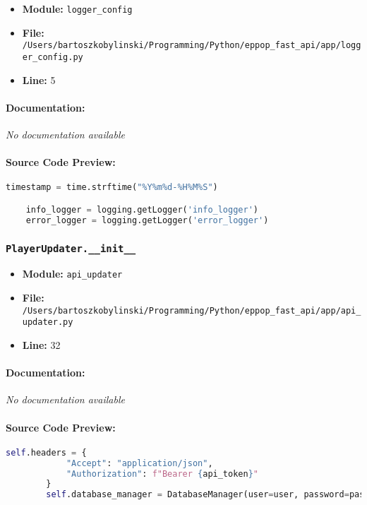 \documentclass[11pt,a4paper]{article}
\begin{document}
\begin{itemize}
    \item \textbf{Module:} \texttt{logger\_config}
    \item \textbf{File:} \texttt{/Users/bartoszkobylinski/Programming/Python/eppop\_fast\_api/app/logger\_config.py}
    \item \textbf{Line:} 5
\end{itemize}

\paragraph{Documentation:} \textit{No documentation available}

\paragraph{Source Code Preview:}
\begin{lstlisting}[language=Python]
    timestamp = time.strftime("%Y%m%d-%H%M%S")

    info_logger = logging.getLogger('info_logger')
    error_logger = logging.getLogger('error_logger')

\end{lstlisting}

\vspace{1em}
\subsubsection{\texttt{PlayerUpdater.\_\_init\_\_}}

\begin{itemize}
    \item \textbf{Module:} \texttt{api\_updater}
    \item \textbf{File:} \texttt{/Users/bartoszkobylinski/Programming/Python/eppop\_fast\_api/app/api\_updater.py}
    \item \textbf{Line:} 32
\end{itemize}

\paragraph{Documentation:} \textit{No documentation available}

\paragraph{Source Code Preview:}
\begin{lstlisting}[language=Python]
        self.headers = {
            "Accept": "application/json",
            "Authorization": f"Bearer {api_token}"
        }
        self.database_manager = DatabaseManager(user=user, password=password, host=host, port=port, db_name=db_name)
\end{lstlisting}
\end{document}
